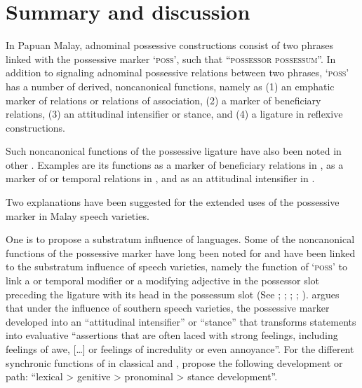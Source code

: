 \section{Summary and discussion}
\label{Para_9.4}
In Papuan Malay, adnominal possessive constructions consist of two    phrases linked with the possessive marker  ‘\textsc{poss}’, such that ``\textsc{possessor}  \textsc{possessum}''. In addition to signaling adnominal possessive relations between two  phrases,  ‘\textsc{poss}’ has a number of derived, noncanonical functions, namely as (1) an emphatic marker of  relations or relations of association, (2) a marker of beneficiary relations, (3) an attitudinal intensifier or stance, and (4) a ligature in reflexive constructions.



Such noncanonical functions of the possessive ligature have also been noted in other . Examples are its functions as a marker of beneficiary relations in  \citep[164]{vanMinde.1997}, as a marker of  or temporal relations in  \citep[52–53, 96–97]{Litamahuputty.1994}, and as an attitudinal intensifier in  \citep[45]{Stoel.2005}.



Two explanations have been suggested for the extended uses of the possessive marker in Malay speech varieties.



One is to propose a substratum influence of  languages. Some of the noncanonical functions of the possessive marker have long been noted for    and have been linked to the substratum influence of    speech varieties, namely the function of  ‘\textsc{poss}’ to link a  or temporal modifier or a modifying adjective in the possessor slot preceding the ligature with its head in the possessum slot (See \citealt[6–7]{Shellabear.1904}; \citealt[115]{Winstedt.1913}; \citeyear*[41]{Winstedt.1938}; \citealt{Lim.1988b}; \citealt{Bao.2009}). \citet[1, 8ff]{Yap.2007}  argues that under the influence of southern  speech varieties, the  possessive marker developed into an “attitudinal intensifier” or “stance” that transforms statements into evaluative “assertions that are often laced with strong feelings, including feelings of awe, [{\ldots}] or feelings of incredulity or even annoyance”. For the different synchronic functions of  in classical and , \citet[159]{Yap.2004} propose the following development or  path: “lexical  {\textgreater} genitive {\textgreater} pronominal {\textgreater} stance development”.



